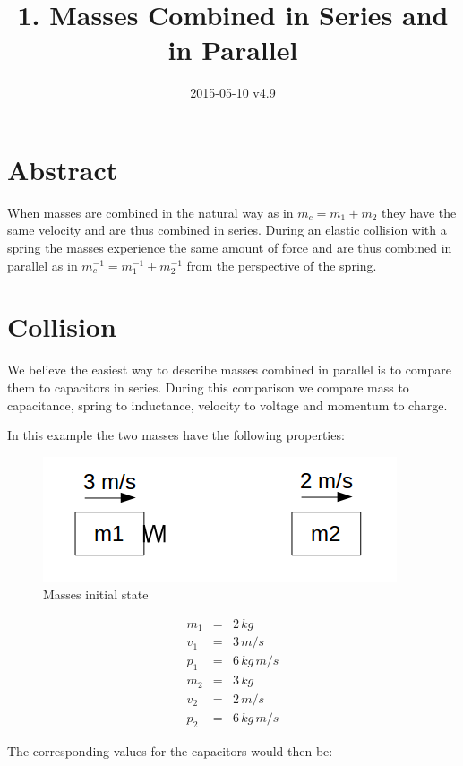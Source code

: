 \documentclass[]{../common/elementary-physics}
\title{1. Masses Combined in Series and in Parallel}
\date{2015-05-10 v4.9}
\begin{document}
\maketitle

\tableofcontents

\section{Abstract}

When masses are combined in the natural way as in $m_c = m_1 + m_2$ they have the same velocity and are thus combined in series.
During an elastic collision with a spring the masses experience the same amount of force and are thus combined in parallel as in $m^{-1}_c = m^{-1}_1 + m^{-1}_2$ from the perspective of the spring.

\section{Collision}

We believe the easiest way to describe masses combined in parallel is to compare them to capacitors in series.
During this comparison\cite{wpana} we compare mass to capacitance, spring to inductance, velocity to voltage and momentum to charge.

In this example the two masses have the following properties:

\begin{figure}[ht] \centering
	\includegraphics[scale=.5]{mms1} \caption{Masses initial state}
\end{figure}

\begin{eqnarray}
m_1 &=& 2 \, kg \\
v_1 &=& 3 \, m/s \\
p_1 &=& 6 \, kg \, m/s \\
m_2 &=& 3 \, kg \\
v_2 &=& 2 \, m/s \\
p_2 &=& 6 \, kg \, m/s
\end{eqnarray}

The corresponding values for the capacitors would then be:
\end{document}
